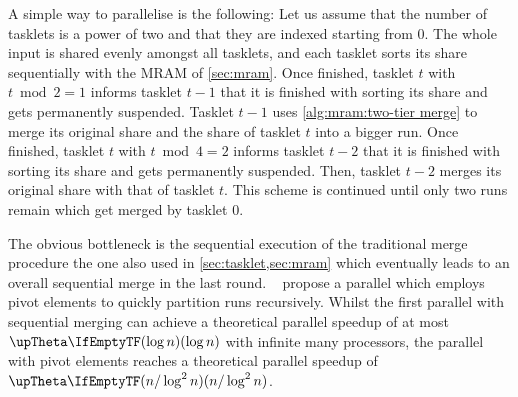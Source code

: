 \medbreak

A simple way to parallelise \MS{} is the following:
Let us assume that the number of tasklets is a power of two and that they are indexed starting from 0.
The whole input is shared evenly amongst all tasklets, and each tasklet sorts its share sequentially with the MRAM \MS{} of \cref{sec:mram}.
Once finished, tasklet \(t\) with \(t \bmod 2 = 1\) informs tasklet \(t - 1\) that it is finished with sorting its share and gets permanently suspended.
Tasklet \(t - 1\) uses \cref{alg:mram:two-tier merge} to merge its original share and the share of tasklet \(t\) into a bigger run.
Once finished, tasklet \(t\) with \(t \bmod 4 = 2\) informs tasklet \(t - 2\) that it is finished with sorting its share and gets permanently suspended.
Then, tasklet \(t - 2\) merges its original share with that of tasklet \(t\).
This scheme is continued until only two runs remain which get merged by tasklet \(0\).

The obvious bottleneck is the sequential execution of the traditional merge procedure \Dash the one also used in \cref{sec:tasklet,sec:mram} \Dash which eventually leads to an overall sequential merge in the last round.
~\cite{cormen2013algorithmen} propose a parallel \MS{} which employs pivot elements to quickly partition runs recursively.
Whilst the first parallel \MS{} with sequential merging can achieve a theoretical parallel speedup of at most \(\bigtheta{\log n}\) with infinite many processors, the parallel \MS{} with pivot elements reaches a theoretical parallel speedup of \(\bigtheta{n / \log^2 n}\).

